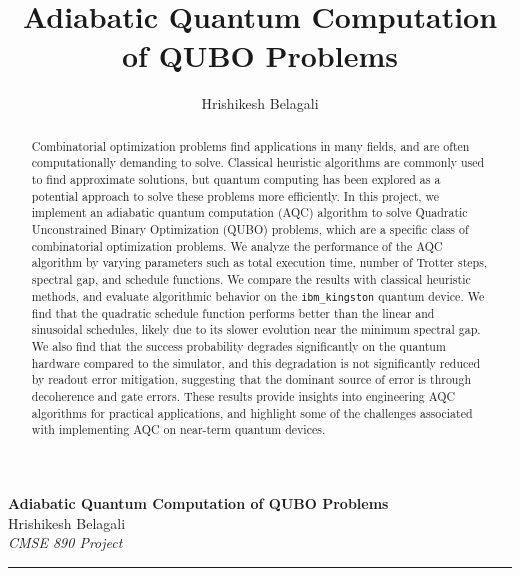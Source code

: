 \documentclass[10pt]{article}
\author{Hrishikesh Belagali}
\title{Adiabatic Quantum Computation of QUBO Problems}
\begin{document}
	
	\begin{center}
		{\Large \textbf{Adiabatic Quantum Computation of QUBO Problems}}\\
		\vspace{1em}
		{\large Hrishikesh Belagali}\\
		\vspace{1em}
		\textit{CMSE 890 Project}
	\end{center}

	\begin{center}
		\rule{150mm}{0.2mm}
	\end{center}		

	\begin{abstract}
		Combinatorial optimization problems find applications in many fields, and are often computationally demanding to solve. Classical heuristic algorithms are commonly used to find approximate solutions, 
		but quantum computing has been explored as a potential approach to solve these problems more efficiently. In this project, we implement an adiabatic quantum computation (AQC) algorithm to solve 
		Quadratic Unconstrained Binary Optimization (QUBO) problems, which are a specific class of combinatorial optimization problems. We analyze the performance of the AQC algorithm by varying parameters such as 
		total execution time, number of Trotter steps, spectral gap, and schedule functions. We compare the results with classical heuristic methods, and evaluate algorithmic behavior on the \texttt{ibm\_kingston} quantum device. 
		We find that the quadratic schedule function performs better than the linear and sinusoidal schedules, likely due to its slower evolution near the minimum spectral gap. We also find that the success probability degrades 
		significantly on the quantum hardware compared to the simulator, and this degradation is not significantly reduced by readout error mitigation, suggesting that the dominant source of error is through decoherence and gate errors. 
		These results provide insights into engineering AQC algorithms for practical applications, and highlight some of the challenges associated with implementing AQC on near-term quantum devices.
	\end{abstract}

	\vspace{5mm}
	
\end{document}
